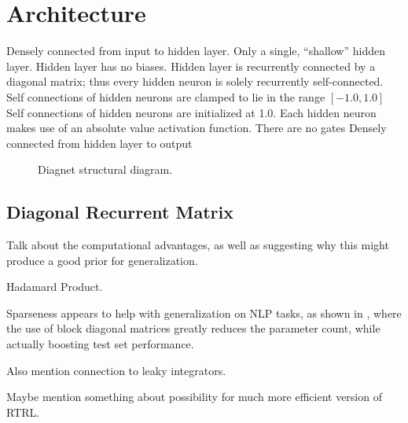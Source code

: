 \documentclass{article}
\begin{document}


\section{Architecture}
\label{headings}



Densely connected from input to hidden layer.
Only a single, “shallow” hidden layer.
Hidden layer has no biases.
Hidden layer is recurrently connected by a diagonal matrix; thus every hidden neuron is solely recurrently self-connected.
Self connections of hidden neurons are clamped to lie in the range $\left[ -1.0, 1.0 \right]$
Self connections of hidden neurons are initialized at 1.0.
Each hidden neuron makes use of an absolute value activation function.
There are no gates
Densely connected from hidden layer to output




\begin{figure}[h]
  \centering
  
  \caption{Diagnet structural diagram.}
\end{figure}

\subsection{Diagonal Recurrent Matrix}

Talk about the computational advantages, as well as suggesting why this might produce a good prior for generalization.

Hadamard Product.

Sparseness appears to help with generalization on NLP tasks, as shown in \citet{2018arXiv180808720D}, where the use of block diagonal matrices greatly reduces the parameter count, while actually boosting test set performance.

Also mention connection to leaky integrators.

Maybe mention something about possibility for much more efficient version of RTRL.
\end{document}
